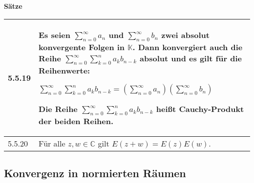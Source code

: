 \noindent 
\textbf{Sätze}
\begin{table}[H]
\begin{tabularx}{\textwidth}{X m{16cm}}
    \toprule

    5.5.19& Es seien $\sum^{\infty}_{n=0} a_n$ und $\sum^{\infty}_{n=0} b_n$ zwei \textbf{absolut konvergente Folgen} in $\mathbb{K}$.
            Dann konvergiert auch die Reihe $\sum^{\infty}_{n=0} \sum^{n}_{k=0} a_k b_{n-k}$ \textbf{absolut} und es gilt für
            die Reihenwerte: \hfill \break
            \centerline{$\sum\limits^{\infty}_{n=0} \sum\limits^{n}_{k=0} a_k b_{n-k} = (\sum\limits^{\infty}_{n=0} a_n) (\sum\limits^{\infty}_{n=0} b_n)$} 
            Die Reihe $\sum\limits^{\infty}_{n=0} \sum\limits^{n}_{k=0} a_k b_{n-k}$ heißt \textbf{Cauchy-Produkt} der beiden Reihen. \\
    \midrule
    5.5.20& Für alle $z,w \in \mathbb{C}$ gilt $E(z+w) = E(z)E(w)$. \\

    \bottomrule
\end{tabularx}
\end{table}

\pagebreak

\subsection{Konvergenz in normierten Räumen}

